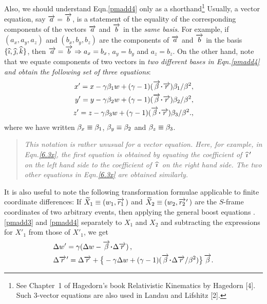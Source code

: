 Also, we should understand Eqn.\eqref{pmadd4} only as  
a 
shorthand\footnote{See Chapter~1 of Hagedorn's book 
Relativistic Kinematics by Hagedorn [4]. Such 3-vector 
equations are also used in Landau and Lifshitz 
[2].} Usually, a vector equation, say $\overrightarrow{a}= 
\overrightarrow{b}$, is 
a statement of the equality of the corresponding 
components 
of the vectors $\overrightarrow{a}$ and  $\overrightarrow{b}$ in the 
\textsl{same 
basis}. For example, if $(a_x,a_y,a_z)$ and 
$(b_x,b_y,b_z)$ 
are the components of  $\overrightarrow{a}$ and $\overrightarrow{b} $ in 
the basis 
$\{{\widehat{\imath}},{\widehat{\jmath}},{\widehat{k}}\}$, then $\overrightarrow{a} = \overrightarrow{b} 
\Rightarrow 
a_x=b_x $, $ a_y=b_y$ and $a_z=b_z$. On the other 
hand, 
note that we equate components of two vectors in 
\textsl{two 
different bases in Eqn.\eqref{pmadd4} and obtain the 
following set of three 
equations}:
\begin{align}\label{6.3x}
 x'=x-\gkg\gkb_1 w +(\gkg-1)(\veca{\gkb}\dotp
\veca{r})\gkb_1/\gkb^2,\notag\\
 y'=y-\gkg\gkb_2 w +(\gkg-1)(\veca{\gkb}\dotp
\veca{r})\gkb_2/\gkb^2,\\
 z'=z-\gkg\gkb_3 w +(\gkg-1)(\veca{\gkb}\dotp
\veca{r})\gkb_3/\gkb^2.\notag,
\end{align}
where we have written ${\beta}_x\equiv{\beta}_1$, 
${\beta}_y\equiv{\beta}_2$ and ${\beta}_z\equiv{\beta}_3$.
\begin{quote}
\textit{This notation is rather \textsl{unusual} for a 
vector equation. Here, for example, in 
Eqn.\eqref{6.3x}, the first equation is obtained by 
equating the coefficient of $\,{\widehat{\imath}}\,'\,$ on the left 
hand side to the coefficient of $\,{\widehat{\imath}}\,$ on the 
right hand side. The two other equations in 
Eqn.\eqref{6.3x} are obtained similarly. }
\end{quote}

It is  also useful to note the following 
transformation formulae applicable to finite 
coordinate 
differences: If $\widetilde{X}_1 \equiv 
(w_1,\overrightarrow{r_1}\,) $ and  $\widetilde{X}_2 \equiv 
(w_2,{\overrightarrow{r_2}\hspace*{.3pt}'}\,) $ are the $S$-frame coordinates of 
two 
arbitrary events, then applying the general boost 
equations .\eqref{pmadd3} and \eqref{pmadd4} separately 
to  
$X_1$ and $X_2$ and subtracting the expressions for 
$X'_1$ 
from those of  $X'_1$, we get 
\begin{align}\label{pmadd4a}
&\Delta w'=\gkg(\Delta w-\veca{\gkb}\dotp \Delta 
\veca{r})\,,\\
&\Delta \pvec{r} =\Delta \veca{r} + \big\{-\gkg \Delta 
w 
+(\gkg-1) (\veca{\gkb}\dotp \Delta\veca{r}/\gkb^2) 
\big\}\,\veca{\gkb}\label{pmadd4b}.
\end{align}

